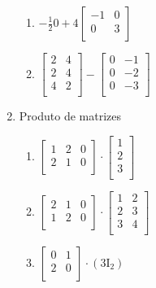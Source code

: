 \documentclass[a4paper]{article}
\begin{document}
\begin{multicols}{2}
\begin{enumerate}
\begin{enumerate}
\item 
$
-\frac{1}{2}\mathrm{0} +4
\begin{bmatrix}
  -1 & 0\\
  0 & 3\\
\end{bmatrix}
$

\item 
$ 
\begin{bmatrix}
  2 & 4\\
  2 & 4\\
  4 & 2\\
\end{bmatrix}
-
\begin{bmatrix}
  0 & -1\\
  0 & -2\\
  0 & -3\\
\end{bmatrix}
$

\end{enumerate}

\item Produto de matrizes

  \begin{enumerate}
\item 
$
\begin{bmatrix}
  1 & 2 & 0\\
  2 & 1 & 0\\
\end{bmatrix}
\cdot
\begin{bmatrix}
  1\\
  2\\
  3\\
\end{bmatrix}
$

\item 
$
\begin{bmatrix}
  2 & 1 & 0\\
  1 & 2 & 0\\
\end{bmatrix}
\cdot
\begin{bmatrix}
  1 & 2\\
  2 & 3\\
  3 & 4\\
\end{bmatrix}
$

\item 
$
\begin{bmatrix}
0 & 1\\
2 & 0\\
\end{bmatrix}
\cdot
(3\mathrm{I}_2)
$


\end{enumerate}
\end{enumerate}
\end{multicols}
\end{document}
